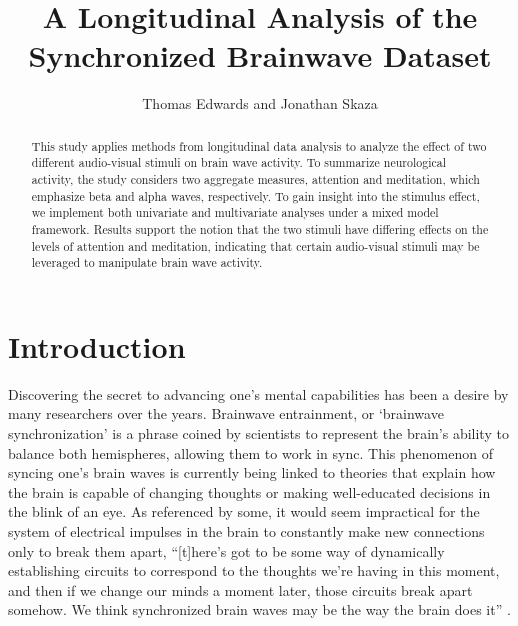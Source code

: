 \documentclass{article}[12pt]
\title{A Longitudinal Analysis of the Synchronized Brainwave Dataset}
\author{Thomas Edwards and Jonathan Skaza}
\begin{document}
\maketitle
\begin{abstract}
This study applies methods from longitudinal data analysis to analyze the effect of two different audio-visual stimuli on brain wave activity. To summarize neurological activity, the study considers two aggregate measures, attention and meditation, which emphasize beta and alpha waves, respectively. To gain insight into the stimulus effect, we implement both univariate and multivariate analyses under a mixed model framework. Results support the notion that the two stimuli have differing effects on the levels of attention and meditation, indicating that certain audio-visual stimuli may be leveraged to manipulate brain wave activity. 
\end{abstract}
\section{Introduction}

Discovering the secret to advancing one's mental capabilities has been a desire by many researchers over the years. Brainwave entrainment, or `brainwave synchronization' is a phrase coined by scientists to represent the brain's ability to balance both hemispheres, allowing them to work in sync. This phenomenon of syncing one's brain waves is currently being linked to theories that explain how the brain is capable of changing thoughts or making well-educated decisions in the blink of an eye. As referenced by some, it would seem impractical for the system of electrical impulses in the brain to constantly make new connections only to break them apart, ``[t]here's got to be some way of dynamically establishing circuits to correspond to the thoughts we're having in this moment, and then if we change our minds a moment later, those circuits break apart somehow. We think synchronized brain waves may be the way the brain does it'' \cite{trafton}. 
\end{document}
